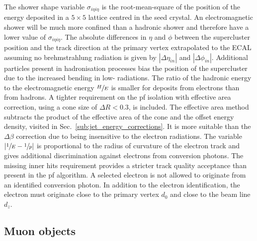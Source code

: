 The shower shape variable $\sigma_{i\eta i\eta}$ is the root-mean-square of the position of the energy deposited in a $5\times5$ lattice centred in the seed crystal.
An electromagnetic shower will be much more confined than a hadronic shower and therefore have a lower value of $\sigma_{i\eta i\eta}$.
The absolute differences in $\eta$ and $\phi$ between the supercluster position and the track direction at the primary vertex extrapolated to the ECAL assuming no brehmstrahlung radiation is given by $|\Delta \eta_{in}|$ and $|\Delta \phi_{in}|$.
Additional particles present in hadronisation processes bias the position of the supercluster due to the increased bending in low-\pt{} radiations.
The ratio of the hadronic energy to the electromagnetic energy $\sfrac{H}{E}$ is smaller for deposits from electrons than from hadrons.
A tighter requirement on the \acrshort{pf} isolation with effective area correction, using a cone size of $\Delta R < 0.3$, is included.
The effective area method subtracts the product of the effective area of the cone and the offset energy density, visited in Sec.~\ref{sub:jet_energy_corrections}.
It is more suitable than the $\Delta\beta$ correction due to being insensitive to the electron radiations.
The variable $|\sfrac{1}{E}-\sfrac{1}{p}|$ is proportional to the radius of curvature of the electron track and gives additional discrimination against electrons from conversion photons.
The missing inner hits requirement provides a stricter track quality acceptance than present in the \acrshort{pf} algorithm.
A selected electron is not allowed to originate from an identified conversion photon.
In addition to the electron identification, the electron must originate close to the primary vertex $d_{0}$ and close to the beam line $d_{z}$.



\subsection{Muon objects}
\label{sec:mu}

